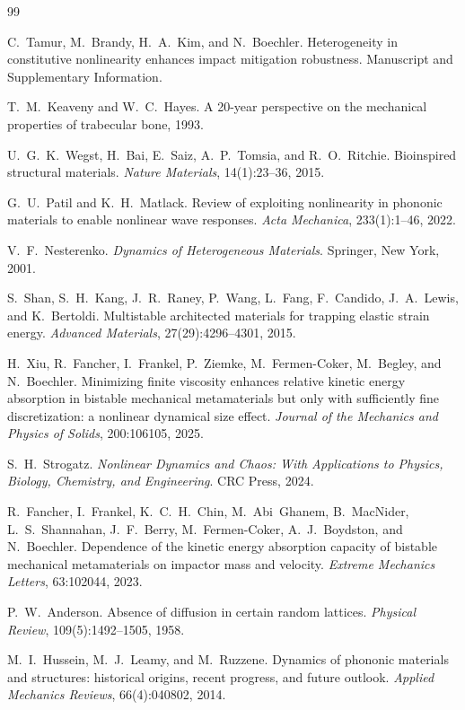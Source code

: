 \documentclass[12pt,letterpaper]{article}
\begin{document}
\begin{thebibliography}{99}\small

C.~Tamur, M.~Brandy, H.~A.~Kim, and N.~Boechler.
Heterogeneity in constitutive nonlinearity enhances impact mitigation robustness.
Manuscript and Supplementary Information.

T.~M.~Keaveny and W.~C.~Hayes.
A 20-year perspective on the mechanical properties of trabecular bone, 1993.

U.~G.~K.~Wegst, H.~Bai, E.~Saiz, A.~P.~Tomsia, and R.~O.~Ritchie.
Bioinspired structural materials.
\emph{Nature Materials}, 14(1):23--36, 2015.

G.~U.~Patil and K.~H.~Matlack.
Review of exploiting nonlinearity in phononic materials to enable nonlinear wave
responses.
\emph{Acta Mechanica}, 233(1):1--46, 2022.

V.~F.~Nesterenko.
\emph{Dynamics of Heterogeneous Materials}.
Springer, New York, 2001.

S.~Shan, S.~H.~Kang, J.~R.~Raney, P.~Wang, L.~Fang, F.~Candido, J.~A.~Lewis, and
K.~Bertoldi.
Multistable architected materials for trapping elastic strain energy.
\emph{Advanced Materials}, 27(29):4296--4301, 2015.

H.~Xiu, R.~Fancher, I.~Frankel, P.~Ziemke, M.~Fermen-Coker, M.~Begley, and
N.~Boechler.
Minimizing finite viscosity enhances relative kinetic energy absorption in bistable
mechanical metamaterials but only with sufficiently fine discretization: a nonlinear
dynamical size effect.
\emph{Journal of the Mechanics and Physics of Solids}, 200:106105, 2025.

S.~H.~Strogatz.
\emph{Nonlinear Dynamics and Chaos: With Applications to Physics, Biology, Chemistry,
and Engineering}.
CRC Press, 2024.

R.~Fancher, I.~Frankel, K.~C.~H.~Chin, M.~Abi~Ghanem, B.~MacNider, L.~S.~Shannahan,
J.~F.~Berry, M.~Fermen-Coker, A.~J.~Boydston, and N.~Boechler.
Dependence of the kinetic energy absorption capacity of bistable mechanical
metamaterials on impactor mass and velocity.
\emph{Extreme Mechanics Letters}, 63:102044, 2023.

P.~W.~Anderson.
Absence of diffusion in certain random lattices.
\emph{Physical Review}, 109(5):1492--1505, 1958.

M.~I.~Hussein, M.~J.~Leamy, and M.~Ruzzene.
Dynamics of phononic materials and structures: historical origins, recent progress,
and future outlook.
\emph{Applied Mechanics Reviews}, 66(4):040802, 2014.


\end{thebibliography}
\end{document}
